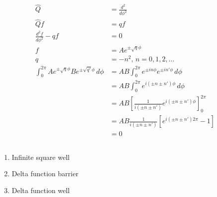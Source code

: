 \documentclass{article}
\begin{document}
\begin{enumerate}
        \begin{align*}
          \hat{Q}                                                                  & = \frac{d^2}{d \phi^2}                                                              \\
          \hat{Q} f                                                                & = q f                                                                               \\
          \frac{d^2 f}{d \phi^2} - q f                                             & = 0                                                                                 \\
          f                                                                        & = A e^{\pm \sqrt{q} \phi}                                                           \\
          q                                                                        & = -n^2, \,n = 0, 1, 2, \ldots                                                       \\
          \int_0^{2 \pi} A e^{\pm \sqrt{q} \phi} B e^{\pm \sqrt{q'} \phi} \,d \phi & = A B \int_0^{2 \pi} e^{\pm i n \phi} e^{\pm i n' \phi} \,d \phi                    \\
                                                                                   & = A B \int_0^{2 \pi} e^{i (\pm n \pm n') \phi} \,d \phi                             \\
                                                                                   & = A B \left[ \frac{1}{i (\pm n \pm n')} e^{i (\pm n \pm n') \phi} \right]_0^{2 \pi} \\
                                                                                   & = A B \frac{1}{i (\pm n \pm n')} [e^{i (\pm n \pm n') 2 \pi} - 1]                   \\
                                                                                   & = 0
        \end{align*}
\end{enumerate}

\subsection{}

\begin{enumerate}
  \item Infinite square well

  \item Delta function barrier

  \item Delta function well
\end{enumerate}
\end{document}
